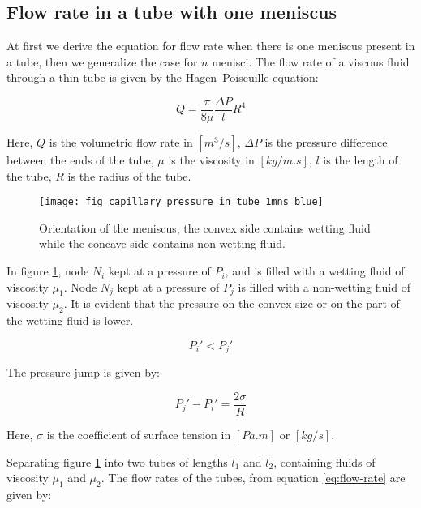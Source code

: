 \subsection{Flow rate in a tube with one meniscus} \label{sec:simple-flow-rate}
	At first we derive the equation for flow rate when there is one meniscus present in a tube, then we generalize the case for $n$ menisci. The flow rate of a viscous fluid through a thin tube is given by the Hagen–Poiseuille equation:
	
	\begin{equation} \label{eq:flow-rate}
		Q = \frac{\pi}{8\mu} \frac{\Delta P}{l} R^4
	\end{equation}
	
	Here, $Q$ is the volumetric flow rate in $[m^3/s]$, $\Delta P$ is the pressure difference between the ends of the tube, $\mu$ is the viscosity in $[kg/m.s]$, $l$ is the length of the tube, $R$ is the radius of the tube.
	
	\begin{figure}[H]
		\centering
		\texttt{[image: fig\_capillary\_pressure\_in\_tube\_1mns\_blue]}
		\caption{Orientation of the meniscus, the convex side contains wetting fluid while the concave side contains non-wetting fluid.}
		\label{fig_capillary_pressure_in_tube_1mns_blue}
	\end{figure}
	
	In figure \ref{fig_capillary_pressure_in_tube_1mns_blue}, node $N_{i}$ kept at a pressure of $P_{i}$, and is filled with a wetting fluid of viscosity $\mu_{1}$. Node $N_{j}$ kept at a pressure of $P_{j}$ is filled with a non-wetting fluid of viscosity $\mu_{2}$. It is evident that the pressure on the convex size or on the part of the wetting fluid is lower.
	
	\begin{equation}
		P_{i}' < P_{j}'
	\end{equation}
	
	The pressure jump is given by:
	
	\begin{equation} \label{eq:capillary_pressure_mns}
		P_{j}' - P_{i}' = \frac{2 \sigma}{R}
	\end{equation}
	
	Here, $\sigma$ is the coefficient of surface tension in $[Pa.m]$ or $[kg/s]$.
	
	Separating figure \ref{fig_capillary_pressure_in_tube_1mns_blue} into two tubes of lengths $l_{1}$ and $l_{2}$, containing fluids of viscosity ${\mu}_1$ and ${\mu}_2$. The flow rates of the tubes, from equation \ref{eq:flow-rate} are given by:
	
